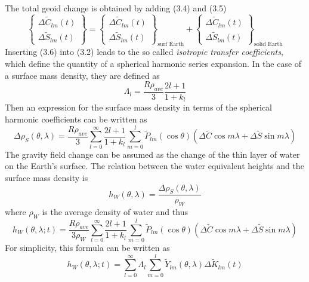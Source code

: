 The total geoid change is obtained by adding (3.4) and (3.5)
\begin{equation}
\begin{Bmatrix}
\Delta \tilde{C}_{lm}(t)\\
\Delta \tilde{S}_{lm}(t)
\end{Bmatrix} = \begin{Bmatrix}
\Delta \tilde{C}_{lm}(t)\\
\Delta \tilde{S}_{lm}(t)
\end{Bmatrix}_{\text{surf Earth}} + \begin{Bmatrix}
\Delta \tilde{C}_{lm}(t)\\
\Delta \tilde{S}_{lm}(t)
\end{Bmatrix}_{\text{solid Earth}}
\end{equation}
Inserting (3.6) into (3.2) leads to the so called \textit{isotropic transfer coefficients}, which define the quantity of a spherical harmonic series expansion. In the case of a surface mass density, they are defined as 
\begin{equation}
\Lambda_{l} = \frac{R\rho_{ave}}{3} \frac{2l+1}{1+k_{l}}
\end{equation} 
Then an expression for the surface mass density in terms of the spherical harmonic coefficients can be written as
\begin{equation}
\Delta \rho_{S}(\theta,\lambda) = \frac{R \rho_{ave}}{3} \sum_{l=0}^{\infty} \frac{2l+1}{1+k_{l}} \sum_{m=0}^{l} \tilde{P}_{lm} (\cos \theta) (\Delta \tilde{C} \cos m \lambda + \Delta \tilde{S} \sin m \lambda)
\end{equation}
The gravity field change can be assumed as the change of the thin layer of water on the Earth's surface. The relation between the water equivalent heights and the surface mass density is
\begin{equation}
h_{W}(\theta,\lambda) = \frac{\Delta \rho_{S}(\theta,\lambda)}{\rho_{W}}
\end{equation}
where $\rho_{W}$ is the average density of water and thus
\begin{equation}
h_{W}(\theta,\lambda;t) = \frac{R \rho_{ave}}{3\rho_{W}} \sum_{l=0}^{\infty} \frac{2l+1}{1+k_{l}} \sum_{m=0}^{l} \tilde{P}_{lm} (\cos \theta) (\Delta \tilde{C} \cos m \lambda + \Delta \tilde{S} \sin m \lambda)
\end{equation}
For simplicity, this formula can be written as 
\begin{equation}
h_{W}(\theta,\lambda;t) = \sum_{l=0}^{\infty} \Lambda_{l} \sum_{m=0}^{l} \tilde{Y}_{lm}(\theta,\lambda) \Delta \tilde{K}_{lm}(t)
\end{equation}
